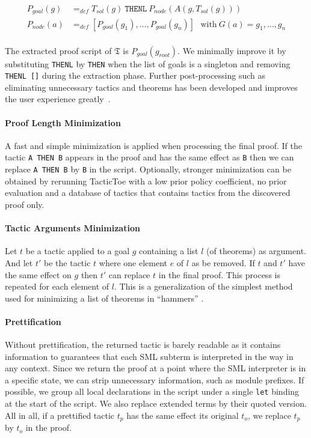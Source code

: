 \documentclass[runningheads,a4paper,draft]{svjour3}
\def\sml{\textsf{SML}\xspace}
\def\tactictoe{\textsf{TacticToe}\xspace}
\begin{document}
\begin{align*}
P_{goal}(g) &=_{def} T_{sol}(g)\ \texttt{THENL}\ P_{node}(A(g,T_{sol}(g)))\\
P_{node}(a) &=_{def} [P_{goal}(g_1),\ldots,P_{goal}(g_n)]\ \ \ \text{with}\
G(a) = g_1,\ldots,g_n\\
\end{align*}

The extracted proof script of $\mathfrak{T}$ is $P_{goal}(g_{root})$.
We minimally improve it by substituting \texttt{THENL} by \texttt{THEN} when the
list of goals is a singleton and removing \texttt{THENL []} during the
extraction phase.
Further post-processing such as
eliminating unnecessary tactics and theorems has been developed and
improves the user experience greatly~\cite{DBLP:conf/sefm/Adams15}.

\paragraph{Proof Length Minimization}
A fast and simple minimization is applied when processing the final proof. If
the tactic \texttt{A THEN B} appears in the proof and has the same effect as
\texttt{B} then we can replace \texttt{A THEN B} by \texttt{B} in the script.
Optionally, stronger minimization can be obtained
by rerunning \tactictoe with a low prior
policy coefficient, no prior evaluation and a database of tactics that contains
tactics from the discovered proof only.

\paragraph{Tactic Arguments Minimization}
Let $t$ be a tactic applied to a goal $g$ containing a list $l$ (of theorems)
as argument. And let $t'$ be the tactic $t$ where one element $e$ of $l$ as be
removed. If $t$ and $t'$ have the same effect on $g$ then $t'$ can replace $t$
in the final proof. This process is repeated for each element of $l$.
This is a generalization of the simplest method used for minimizing a list of
theorems in ``hammers'' \cite{hammers4qed}.

\paragraph{Prettification}
Without prettification, the returned tactic is barely readable as it contains
information to guarantees that each \sml subterm is interpreted in the way in
any context. Since we return the proof at a point where the \sml interpreter is
in a specific state, we can strip unnecessary information, such as
module prefixes. If possible, we group all local declarations in the
script under a single \texttt{let} binding at the start of the script. We
also replace extended terms by their quoted version.
All in all, if a prettified tactic $t_p$ has the same effect its original
$t_o$, we replace $t_p$ by $t_o$ in the proof.\\
\end{document}
